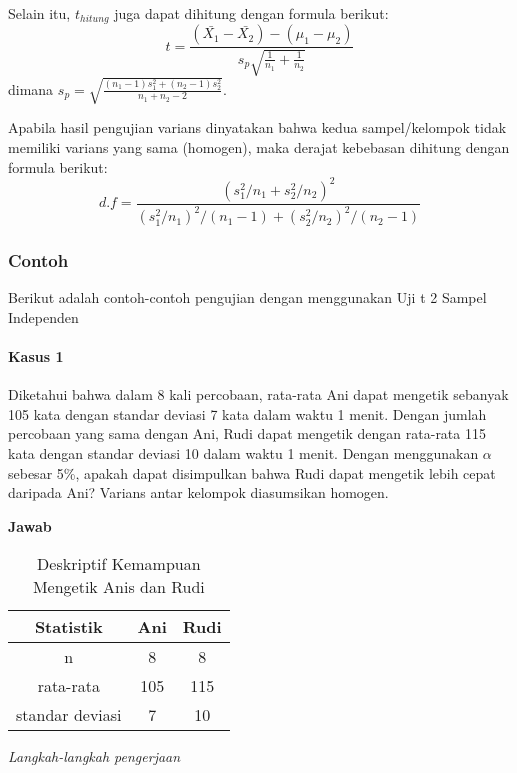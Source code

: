 \documentclass[
]{book}
\begin{document}
Selain itu, \(t_{hitung}\) juga dapat dihitung dengan formula berikut:
\[
t = \frac{(\bar{X_1}-\bar{X_2})-(\mu_1-\mu_2)}{s_p\sqrt{\frac{1}{n_1}+\frac{1}{n_2}}}
\]
dimana \(s_p = \sqrt{\frac{(n_1-1)s^2_1+(n_2-1)s^2_2}{n_1+n_2-2}}\).

Apabila hasil pengujian varians dinyatakan bahwa kedua sampel/kelompok tidak memiliki varians yang sama (homogen), maka derajat kebebasan dihitung dengan formula berikut:
\[
d.f = \frac{(s_1^2/n_1+s_2^2/n_2)^2}{(s_1^2/n_1)^2/(n_1-1)+(s_2^2/n_2)^2/(n_2-1)}
\]

\hypertarget{contoh}{%
\subsubsection{Contoh}\label{contoh}}

Berikut adalah contoh-contoh pengujian dengan menggunakan Uji t 2 Sampel Independen

\hypertarget{kasus-1}{%
\paragraph{Kasus 1}\label{kasus-1}}

Diketahui bahwa dalam 8 kali percobaan, rata-rata Ani dapat mengetik sebanyak 105 kata dengan standar deviasi 7 kata dalam waktu 1 menit. Dengan jumlah percobaan yang sama dengan Ani, Rudi dapat mengetik dengan rata-rata 115 kata dengan standar deviasi 10 dalam waktu 1 menit. Dengan menggunakan \(\alpha\) sebesar 5\%, apakah dapat disimpulkan bahwa Rudi dapat mengetik lebih cepat daripada Ani? Varians antar kelompok diasumsikan homogen.

\textbf{Jawab}\\

\begin{table}

\caption{\label{tab:unnamed-chunk-7}Deskriptif Kemampuan Mengetik Anis dan Rudi}
\centering
\begin{tabular}[t]{ccc}
\toprule
Statistik & Ani & Rudi\\
\midrule
n & 8 & 8\\
rata-rata & 105 & 115\\
standar deviasi & 7 & 10\\
\bottomrule
\end{tabular}
\end{table}

\emph{Langkah-langkah pengerjaan}
\end{document}

